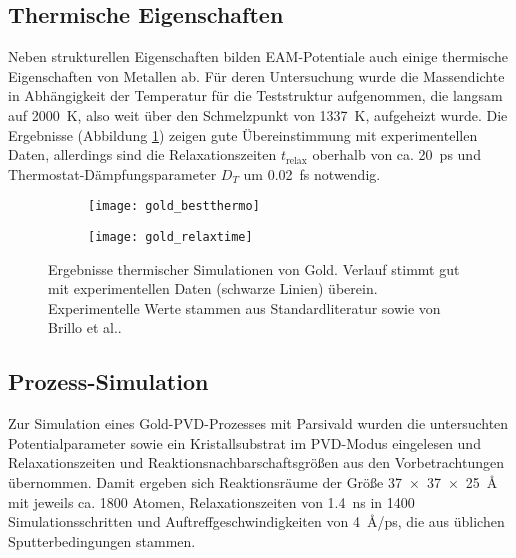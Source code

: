 
\subsection{Thermische Eigenschaften}

Neben strukturellen Eigenschaften bilden EAM-Potentiale auch einige thermische Eigenschaften von Metallen ab.
Für deren Untersuchung wurde die Massendichte in Abhängigkeit der Temperatur für die Teststruktur aufgenommen, die langsam auf \SI{2000}{\kelvin}, also weit über den Schmelzpunkt von \SI{1337}{\kelvin}, aufgeheizt wurde.
Die Ergebnisse (Abbildung \ref{fig:goldthermo}) zeigen gute Übereinstimmung mit experimentellen Daten, allerdings sind die Relaxationszeiten $t_\text{relax}$ oberhalb von ca. \SI{20}{\pico\second} und Thermostat-Dämpfungsparameter $D_T$ um \SI{0.02}{\femto\second} notwendig.

\begin{figure}[tbp]
  \captionsetup[subfigure]{singlelinecheck=false}
  \def\subfigwidth{7cm}
  \begin{subfigure}[t]{\subfigwidth}
    \texttt{[image: gold\_bestthermo]}
  \end{subfigure}
  \hfill
  \begin{subfigure}[t]{\subfigwidth}
    \texttt{[image: gold\_relaxtime]}
  \end{subfigure}
  \caption[Ergebnisse thermischer Simulationen von Gold]{Ergebnisse thermischer Simulationen von Gold.
    Verlauf stimmt gut mit experimentellen Daten (schwarze Linien) überein.
    Experimentelle Werte stammen aus Standardliteratur sowie von Brillo et al.\cite{brillo_density_2006}.
  }
  \label{fig:goldthermo}
\end{figure}

\subsection{Prozess-Simulation}

Zur Simulation eines Gold-PVD-Prozesses mit Parsivald wurden die untersuchten Potentialparameter sowie ein Kristallsubstrat im PVD-Modus eingelesen und Relaxationszeiten und Reaktionsnachbarschaftsgrößen aus den Vorbetrachtungen übernommen.
Damit ergeben sich Reaktionsräume der Größe \SI{37x37x25}{\angstrom} mit jeweils ca. \num{1800} Atomen, Relaxationszeiten von \SI{1.4}{\nano\second} in \num{1400} Simulationsschritten und Auftreffgeschwindigkeiten von \SI{4}{\angstrom/\pico\second}, die aus üblichen Sputterbedingungen stammen.

